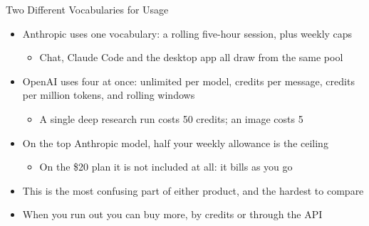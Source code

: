 \documentclass[aspectratio=169]{beamer}
\begin{document}
\begin{frame}{Two Different Vocabularies for Usage}
    \begin{itemize}\setlength{\itemsep}{7pt}
        \item Anthropic uses one vocabulary: a rolling five-hour session, plus weekly caps
        \begin{itemize}
            \item Chat, Claude Code and the desktop app all draw from the same pool
        \end{itemize}
        \item OpenAI uses four at once: unlimited per model, credits per message, credits
              per million tokens, and rolling windows
        \begin{itemize}
            \item A single deep research run costs 50 credits; an image costs 5
        \end{itemize}
        \item On the top Anthropic model, half your weekly allowance is the ceiling
        \begin{itemize}
            \item On the \$20 plan it is not included at all: it bills as you go
        \end{itemize}
        \item This is the most confusing part of either product, and the hardest to compare
        \item When you run out you can buy more, by credits or through the API
    \end{itemize}
\end{frame}
\end{document}
